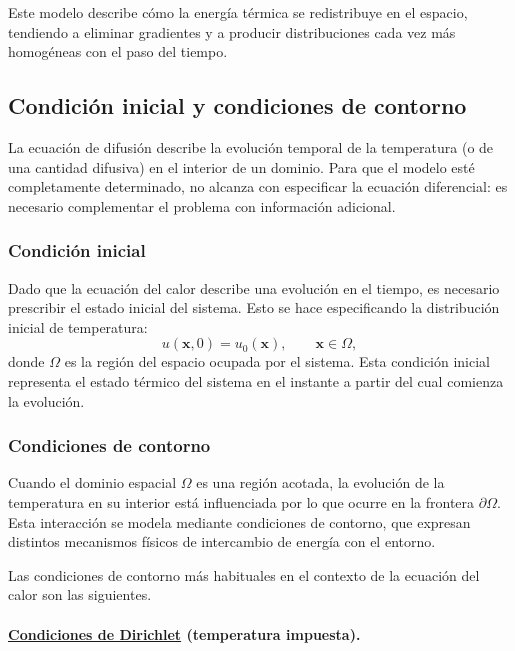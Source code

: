 \documentclass[12pt, a4paper]{amsbook}
\newcommand{\xx}{{\mathbf x}}
\theoremstyle{remark}
\theoremstyle{definition}
\numberwithin{section}{chapter}
\numberwithin{subsection}{section}
\numberwithin{equation}{section}
\numberwithin{figure}{chapter}
\begin{document}
Este modelo describe cómo la energía térmica se redistribuye en el espacio, tendiendo a eliminar gradientes y a producir distribuciones cada vez más homogéneas con el paso del tiempo.

\subsection{Condición inicial y condiciones de contorno}\label{sec:contorno}

La ecuación de difusión describe la evolución temporal de la temperatura (o de una cantidad difusiva) en el interior de un dominio. Para que el modelo esté completamente determinado, no alcanza con especificar la ecuación diferencial: es necesario complementar el problema con información adicional.

\subsubsection*{Condición inicial}

Dado que la ecuación del calor describe una evolución en el tiempo, es necesario prescribir el estado inicial del sistema. Esto se hace especificando la distribución inicial de temperatura:
$$
u(\xx,0) = u_0(\xx), \qquad \xx \in \Omega,
$$
donde $\Omega$ es la región del espacio ocupada por el sistema. Esta condición inicial representa el estado térmico del sistema en el instante a partir del cual comienza la evolución.

\subsubsection*{Condiciones de contorno}

Cuando el dominio espacial $\Omega$ es una región acotada, la evolución de la temperatura en su interior está influenciada por lo que ocurre en la frontera $\partial \Omega$. Esta interacción se modela mediante condiciones de contorno, que expresan distintos mecanismos físicos de intercambio de energía con el entorno.

Las condiciones de contorno más habituales en el contexto de la ecuación del calor son las siguientes.

\paragraph{\underline{Condiciones de Dirichlet} (temperatura impuesta).}
\end{document}
